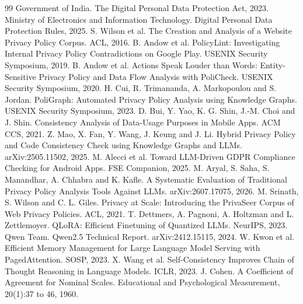 \documentclass[11pt,a4paper]{article}
\begin{document}
\begin{thebibliography}{99}
 Government of India. The Digital Personal Data Protection Act, 2023.
 Ministry of Electronics and Information Technology. Digital Personal Data
  Protection Rules, 2025.
 S. Wilson et al. The Creation and Analysis of a Website Privacy Policy Corpus.
  ACL, 2016.
 B. Andow et al. PolicyLint: Investigating Internal Privacy Policy
  Contradictions on Google Play. USENIX Security Symposium, 2019.
 B. Andow et al. Actions Speak Louder than Words: Entity-Sensitive Privacy
  Policy and Data Flow Analysis with PoliCheck. USENIX Security Symposium, 2020.
 H. Cui, R. Trimananda, A. Markopoulou and S. Jordan. PoliGraph: Automated
  Privacy Policy Analysis using Knowledge Graphs. USENIX Security Symposium, 2023.
 D. Bui, Y. Yao, K. G. Shin, J.-M. Choi and J. Shin. Consistency Analysis of
  Data-Usage Purposes in Mobile Apps. ACM CCS, 2021.
 Z. Mao, X. Fan, Y. Wang, J. Keung and J. Li. Hybrid Privacy Policy and Code
  Consistency Check using Knowledge Graphs and LLMs. arXiv:2505.11502, 2025.
 M. Alecci et al. Toward LLM-Driven GDPR Compliance Checking for Android Apps.
  FSE Companion, 2025.
 M. Aryal, S. Saha, S. Manandhar, A. Chhabra and K. Kafle. A Systematic
  Evaluation of Traditional Privacy Policy Analysis Tools Against LLMs. arXiv:2607.17075, 2026.
 M. Srinath, S. Wilson and C. L. Giles. Privacy at Scale: Introducing the
  PrivaSeer Corpus of Web Privacy Policies. ACL, 2021.
 T. Dettmers, A. Pagnoni, A. Holtzman and L. Zettlemoyer. QLoRA: Efficient
  Finetuning of Quantized LLMs. NeurIPS, 2023.
 Qwen Team. Qwen2.5 Technical Report. arXiv:2412.15115, 2024.
 W. Kwon et al. Efficient Memory Management for Large Language Model Serving with
  PagedAttention. SOSP, 2023.
 X. Wang et al. Self-Consistency Improves Chain of Thought Reasoning in
  Language Models. ICLR, 2023.
 J. Cohen. A Coefficient of Agreement for Nominal Scales. Educational and
  Psychological Measurement, 20(1):37 to 46, 1960.
\end{thebibliography}
\end{document}
